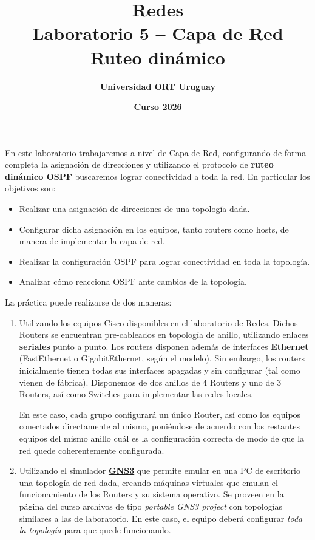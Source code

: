\documentclass[a4paper,10pt]{article}
\title{\bf Redes\\Laboratorio 5 -- Capa de Red\\ Ruteo dinámico}
\author{\bf Universidad ORT Uruguay}
\date{\bf Curso 2026}
\begin{document}
\maketitle
\thispagestyle{fancy}


En este laboratorio trabajaremos a nivel de Capa de Red, configurando de forma completa la asignación de direcciones y utilizando el protocolo de \textbf{ruteo dinámico OSPF} buscaremos lograr conectividad a toda la red. En particular los objetivos son:

\begin{itemize}
    \item Realizar una asignación de direcciones de una topología dada.
    \item Configurar dicha asignación en los equipos, tanto routers como hosts, de manera de implementar la capa de red.
    \item Realizar la configuración OSPF para lograr conectividad en toda la topología.
    \item Analizar cómo reacciona OSPF ante cambios de la topología.
\end{itemize}

La práctica puede realizarse de dos maneras:

\begin{enumerate}[label={\bf \alph*)}]
    \item Utilizando los equipos Cisco disponibles en el laboratorio de Redes. Dichos Routers se encuentran pre-cableados en topología de anillo, utilizando enlaces \textbf{seriales} punto a punto. Los routers disponen además de interfaces \textbf{Ethernet} (FastEthernet o GigabitEthernet, según el modelo). Sin embargo, los routers inicialmente tienen todas sus interfaces apagadas y sin configurar (tal como vienen de fábrica). Disponemos de dos anillos de 4 Routers y uno de 3 Routers, así como Switches para implementar las redes locales.
    
    En este caso, cada grupo configurará un único Router, así como los equipos conectados directamente al mismo, poniéndose de acuerdo con los restantes equipos del mismo anillo cuál es la configuración correcta de modo de que la red quede coherentemente configurada.

    \item Utilizando el simulador \href{https://www.gns3.com/}{\bf GNS3} que permite emular en una PC de escritorio una topología de red dada, creando máquinas virtuales que emulan el funcionamiento de los Routers y su sistema operativo. Se proveen en la página del curso archivos de tipo \emph{portable GNS3 project} con topologías similares a las de laboratorio. En este caso, el equipo deberá configurar \emph{toda la topología} para que quede funcionando.
    
\end{enumerate}
\end{document}
